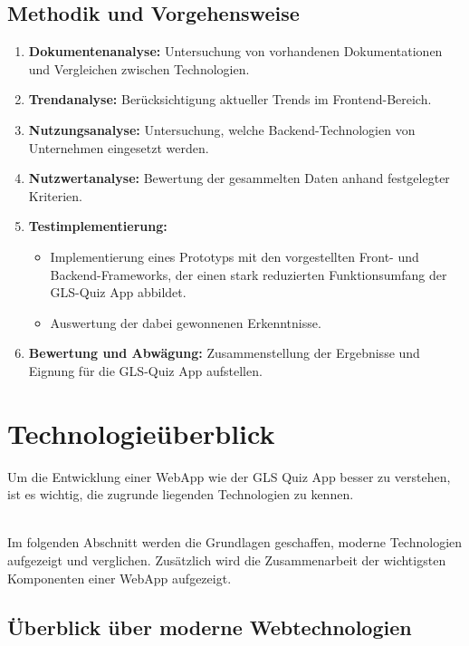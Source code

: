 \documentclass[biblatex]{lni}
\begin{document}
\subsection{Methodik und Vorgehensweise}

\begin{enumerate}
  \item \textbf{Dokumentenanalyse:} Untersuchung von vorhandenen Dokumentationen und Vergleichen zwischen Technologien.
  \item \textbf{Trendanalyse:} Berücksichtigung aktueller Trends im Frontend-Bereich.
  \item \textbf{Nutzungsanalyse:} Untersuchung, welche Backend-Technologien von Unternehmen eingesetzt werden.
  \item \textbf{Nutzwertanalyse:} Bewertung der gesammelten Daten anhand festgelegter Kriterien.
  \item \textbf{Testimplementierung:}
  \begin{itemize}
    \item Implementierung eines Prototyps mit den vorgestellten Front- und Backend-Frameworks,
          der einen stark reduzierten Funktionsumfang der GLS-Quiz App abbildet.
    \item Auswertung der dabei gewonnenen Erkenntnisse.
  \end{itemize}
  \item \textbf{Bewertung und Abwägung:} Zusammenstellung der Ergebnisse und Eignung für die GLS-Quiz App aufstellen.
\end{enumerate}

\section{Technologieüberblick}
\label{sec:tec-überblick}
Um die Entwicklung einer \ac{WebApp} wie der GLS Quiz App besser zu verstehen,
ist es wichtig, die zugrunde liegenden Technologien zu kennen.

\\

Im folgenden Abschnitt werden die Grundlagen geschaffen,
moderne Technologien aufgezeigt und verglichen.
Zusätzlich wird die Zusammenarbeit der wichtigsten Komponenten einer \ac{WebApp} aufgezeigt.

\subsection{Überblick über moderne Webtechnologien}
\label{sec:moderne-webtechnologien}
\end{document}
